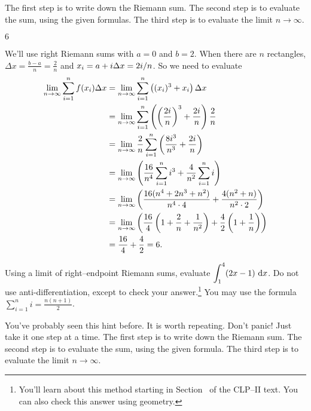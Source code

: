 \begin{hint}
The first step is to write down the Riemann sum.
The second step is to evaluate the sum, using the given formulas.
The third step is to evaluate the limit $n\rightarrow\infty$.
\end{hint}

\begin{answer}
$6$
\end{answer}

\begin{solution}
We'll use right Riemann sums with $a=0$ and $b=2$. When there are $n$ rectangles,
$\Delta x = \frac{b-a}{n}=\frac{2}{n}$ and  $x_i = a+i\Delta x=2i/n$.  So
we need to evaluate
\begin{align*}
\lim_{n\to\infty} \sum_{i=1}^{n} f(x_i)\Delta x
&=\lim_{n\to\infty} \sum_{i=1}^{n} \left( (x_i)^3 + x_i\right) \Delta x\\
  &=\lim_{n\to\infty} \sum_{i=1}^{n} \left( \left(\frac{2i}{n}\right)^3 + \frac{2i}{n}\right)
             \frac{2}{n} \\
   & = \lim_{n\to\infty} \frac{2}{n} \sum_{i=1}^{n} \left(\frac{8i^3}{n^3} + \frac{2i}{n}\right) \\
&= \lim_{n\to\infty} \left( \frac{16}{n^4} \sum_{i=1}^{n} i^3 + \frac{4}{n^2} \sum_{i=1}^{n} i \right) \\
   & = \lim_{n\to\infty} \left( \frac{16(n^4+2n^3+n^2)}{n^4 \cdot 4} + \frac{4(n^2+n)}{n^2 \cdot 2} \right) \\
&= \lim_{n\to\infty} \left( \frac{16}{4}\left(1+\frac{2}{n} + \frac1{n^2} \right) + \frac{4}{2}\left(1+\frac{1}{n}\right)\right) \\
& = \frac{16}{4} + \frac{4}{2} = 6.
\end{align*}
\end{solution}


\begin{Mquestion}[2014D]
Using a limit of right--endpoint Riemann sums, evaluate
$\displaystyle\int_1^4 (2x-1)\,\,\mathrm{d}x$.
Do not use  anti-differentiation, except to check your answer.\footnote{You'll learn about this method starting in Section~ of the CLP--II text.
You can also check this answer using geometry.}
You may use the formula $\sum\limits_{i=1}^{n} i = \frac{n(n+1)}{2}$.
\end{Mquestion}

\begin{hint}
You've probably seen this hint before. It is worth repeating.
Don't panic! Just take it one step at a time.
The first step is to write down the Riemann sum.
The second step is to evaluate the sum, using the given formula.
The third step is to evaluate the limit $n\rightarrow\infty$.
\end{hint}

